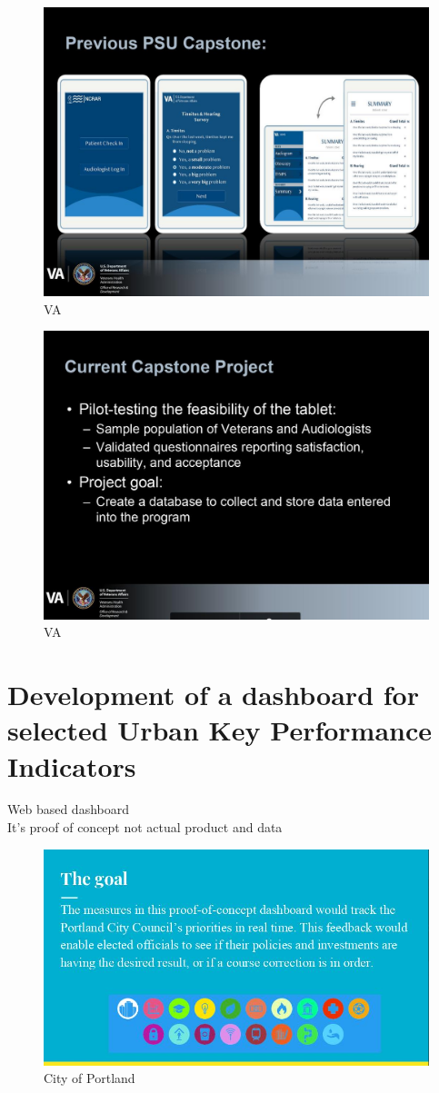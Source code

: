 \newpage
\begin{figure}[h!]
\centering
\includegraphics[width=0.8\linewidth]{P2-c.jpg}
\caption[VA]{VA}
\label{fig:VA}
\end{figure}	
\newpage
\begin{figure}[h!]
\centering
\includegraphics[width=0.8\linewidth]{P2-d.jpg}
\caption[VA]{VA}
\label{fig:VA}
\end{figure}	

\newpage
\section*{Development of a dashboard for selected Urban Key Performance Indicators}

Web based dashboard\\

It's proof of concept not actual product and data\\

\begin{figure}[h!]
\centering
\includegraphics[width=0.8\linewidth]{P4-a.jpg}
\caption[City of Portland]{City of Portland}
\label{fig:City of Portland}
\end{figure}	

